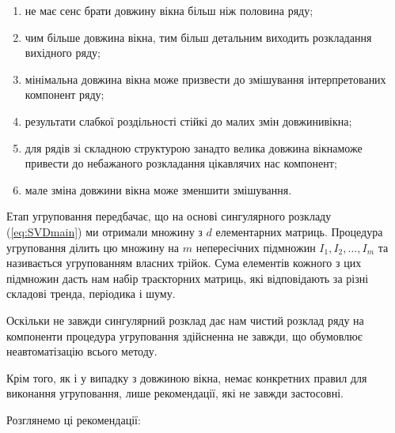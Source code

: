 \begin{enumerate}
	\item не має сенс брати довжину вікна більш ніж половина ряду;
	\item чим більше довжина вікна, тим більш детальним виходить\newline
\hspace*{-18mm}розкладання вихідного ряду;
	\item мінімальна довжина вікна може призвести до змішування\newline 
\hspace*{-18mm}інтерпретованих компонент ряду;
	\item результати слабкої роздільності стійкі до малих змін довжини\newline \hspace*{-18mm}вікна;
	\item для рядів зі складною структурою занадто велика довжина вікна\newline \hspace*{-18mm}може привести до небажаного розкладання цікавлячих нас компонент;
	\item мале зміна довжини вікна може зменшити змішування.
\end{enumerate}



Етап угруповання передбачає, що на основі сингулярного розкладу (\ref{eq:SVDmain}) ми отримали множину з $d$ елементарних матриць. Процедура угруповання ділить цю множину на $m$ непересічних підмножин $I_{1}, I_{2}, \dots, I_{m}$ та називається угрупованням власних трійок. Сума елементів кожного з цих підмножин дасть нам набір траєкторних матриць, які відповідають за різні складові тренда, періодика і шуму.

Оскільки не завжди сингулярний розклад дає нам чистий розклад ряду на компоненти процедура угруповання здійсненна не завжди, що обумовлює неавтоматізацію всього методу.

Крім того, як і у випадку з довжиною вікна, немає конкретних правил для виконання угруповання, лише рекомендації, які не завжди застосовні. 

Розглянемо ці рекомендації:

